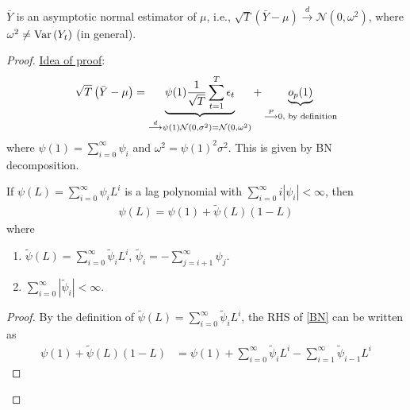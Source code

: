 \documentclass[11pt]{elegantbook}
\begin{document}
\begin{lemma}
    $\bar{Y}$ is an asymptotic normal estimator of $\mu$, i.e., $\sqrt{T}\left(\bar{Y}-\mu\right)\stackrel{d}{\longrightarrow} \mathcal{N}\left(0,\omega^2\right)$, where $\omega^2\neq \textnormal{Var}\left(Y_t\right)$ (in general).
\end{lemma}
\begin{proof}
    \underline{Idea of proof}:
    \begin{equation}
        \begin{aligned}
            \sqrt{T}\left(\bar{Y}-\mu\right)=\underbrace{\psi(1)\frac{1}{\sqrt{T}}\sum_{t=1}^T\epsilon_t}_{\stackrel{d}{\longrightarrow} \psi(1)\mathcal{N}\left(0,\sigma^2\right)=\mathcal{N}\left(0,\omega^2\right)} + \underbrace{o_p(1)}_{\stackrel{P}{\longrightarrow} 0, \textnormal{ by definition}}
        \end{aligned}
        \nonumber
    \end{equation}
    where $\psi(1)=\sum_{i=0}^\infty \psi_i$ and $\omega^2=\psi(1)^2\sigma^2$. This is given by BN decomposition.
    \begin{theorem}[BN Decomposition]
        If $\psi(L)=\sum_{i=0}^\infty \psi_i L^i$ is a lag polynomial with $\sum_{i=0}^\infty i|\psi_i|<\infty$, then
        \begin{equation}
            \begin{aligned}
                \psi(L)=\psi(1)+\tilde{\psi}(L)(1-L)
            \end{aligned}
            \label{BN}
        \end{equation}
        where
        \begin{enumerate}[$\circ$]
            \item $\tilde{\psi}(L)=\sum_{i=0}^\infty \tilde{\psi}_i L^i$, $\tilde{\psi}_i=-\sum_{j=i+1}^\infty \psi_j$.
            \item $\sum_{i=0}^\infty |\tilde{\psi}_i|<\infty$.
        \end{enumerate}
    \end{theorem}
    \begin{proof}
        By the definition of $\tilde{\psi}(L)=\sum_{i=0}^\infty \tilde{\psi}_i L^i$, the RHS of \eqref{BN} can be written as
        \begin{equation}
            \begin{aligned}
                \psi(1)+\tilde{\psi}(L)(1-L)&=\psi(1)+\sum_{i=0}^\infty \tilde{\psi}_i L^i-\sum_{i=1}^\infty \tilde{\psi}_{i-1} L^i
            \end{aligned}

\end{equation}
\end{proof}
\end{proof}
\end{document}
